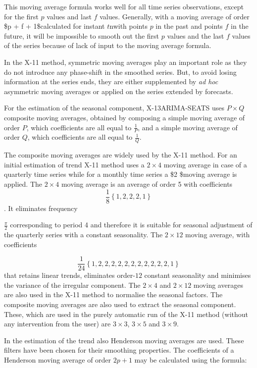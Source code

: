 \documentclass[
  letterpaper,
  DIV=11,
  numbers=noendperiod]{scrreprt}
\begin{document}
This moving average formula works well for all time series observations,
except for the first \(p\) values and last \(f\) values. Generally, with
a moving average of order \$p + f + 1\$calculated for instant \(t\)nwith
points \(p\) in the past and points \(f\) in the future, it will be
impossible to smooth out the first \(p\) values and the last \(f\)
values of the series because of lack of input to the moving average
formula.

In the X-11 method, symmetric moving averages play an important role as
they do not introduce any phase-shift in the smoothed series. But, to
avoid losing information at the series ends, they are either
supplemented by \emph{ad hoc} asymmetric moving averages or applied on
the series extended by forecasts.

For the estimation of the seasonal component, X-13ARIMA-SEATS uses
\(P \times Q\) composite moving averages, obtained by composing a simple
moving average of order \(P\), which coefficients are all equal to
\(\frac{1}{P}\), and a simple moving average of order \(Q\), which
coefficients are all equal to \(\frac{1}{Q}\).

The composite moving averages are widely used by the X-11 method. For an
initial estimation of trend X-11 method uses a \(2 \times 4\) moving
average in case of a quarterly time series while for a monthly time
series a \$2 \$moving average is applied. The \(2 \times 4\)
moving average is an average of order 5 with coefficients
\[\frac{1}{8}\left\{1, 2, 2, 2, 1\right\}\]. It eliminates frequency

\(\frac{\pi}{2}\) corresponding to period 4 and therefore it is suitable
for seasonal adjustment of the quarterly series with a constant
seasonality. The \(2 \times 12\) moving average, with coefficients

\[\frac{1}{24}\left\{1, 2, 2, 2, 2, 2, 2, 2, 2, 2, 2, 2, 1\right\} \]that
retains linear trends, eliminates order-\(12\) constant seasonality and
minimises the variance of the irregular component. The \(2 \times 4\)
and \(2 \times 12\) moving averages are also used in the X-11 method to
normalise the seasonal factors. The composite moving averages are also
used to extract the seasonal component. These, which are used in the
purely automatic run of the X-11 method (without any intervention from
the user) are \(3 \times 3\), \(3 \times 5\) and \(3 \times 9\).

In the estimation of the trend also Henderson moving averages are used.
These filters have been chosen for their smoothing properties. The
coefficients of a Henderson moving average of order \(2p + 1\) may be
calculated using the formula:
\end{document}
